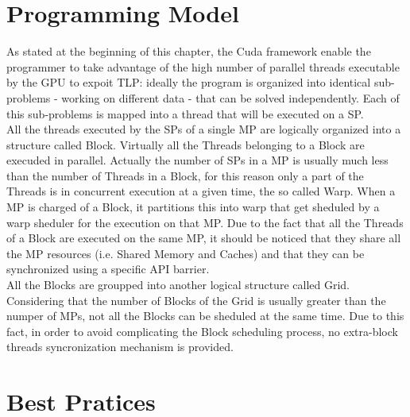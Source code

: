 \section{Programming Model}
As stated at the beginning of this chapter, the Cuda framework enable the programmer to take advantage of the high number of parallel threads executable by the GPU to expoit TLP: ideally the program is organized into identical sub-problems - working on different data - that can be solved independently. Each of this sub-problems is mapped into a thread that will be executed on a SP.\\
All the threads executed by the SPs of a single MP are logically organized into a structure called Block. Virtually all the Threads belonging to a Block are execuded in parallel. Actually the number of SPs in a MP is usually much less than the number of Threads in a Block, for this reason only a part of the Threads is in concurrent execution at a given time, the so called Warp. When a MP is charged of a Block, it partitions this into warp that get sheduled by a warp sheduler for the execution on that MP. Due to the fact that all the Threads of a Block are executed on the same MP, it should be noticed that they share all the MP resources (i.e. Shared Memory and Caches) and that they can be synchronized using a specific API barrier.\\
All the Blocks are groupped into another logical structure called Grid. Considering that the number of Blocks of the Grid is usually greater than the numper of MPs, not all the Blocks can be sheduled at the same time. Due to this fact, in order to avoid complicating the Block scheduling process, no extra-block threads syncronization mechanism is provided.\\ 

\section{Best Pratices}
